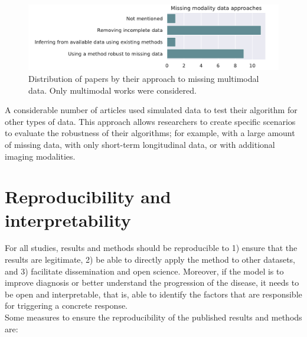 \begin{figure}[!htbp]
     \centering
     \includegraphics[width=1.0\textwidth]{figures/review/Fig9.pdf}
     \caption[Distribution of papers by their approach to missing multimodal data.]{Distribution of papers by their approach to missing multimodal data. Only multimodal works were considered.}
     \label{fig:missingmod}
\end{figure}

A considerable number of articles \cite{Chen2011b,Chen2012,Eshaghi2017,Hyun2016,Li2013,Li2017b,Zhang2014,Ziegler2015b} used simulated data to test their algorithm for other types of data. This approach allows researchers to create specific scenarios to evaluate the robustness of their algorithms; for example, with a large amount of missing data, with only short-term longitudinal data, or with additional imaging modalities. \\

\section{Reproducibility and interpretability}
\label{sec:bias}

For all studies, results and methods should be reproducible to 1) ensure that the results are legitimate, 2) be able to directly apply the method to other datasets, and 3) facilitate dissemination and open science. Moreover, if the model is to improve diagnosis or better understand the progression of the disease, it needs to be open and interpretable, that is, able to identify the factors that are responsible for triggering a concrete response. \\

Some measures to  ensure the reproducibility of the published results and methods are:

